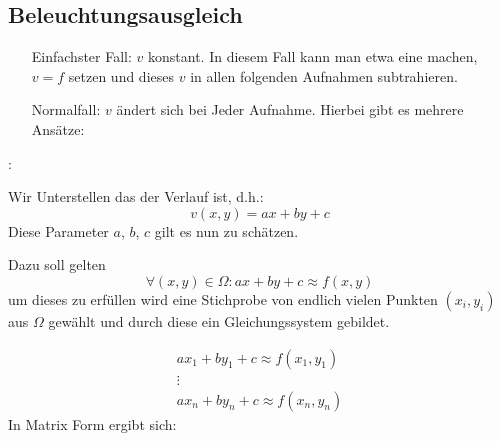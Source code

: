 \subsection{Beleuchtungsausgleich}

\begin{enumerate}
  \item[Einfachster Fall:] $v$ konstant. In diesem Fall kann man etwa eine  machen, $v=f$ setzen und dieses $v$ in allen folgenden Aufnahmen subtrahieren.
  \item[Normalfall:] $v$ ändert sich bei Jeder Aufnahme. Hierbei gibt es mehrere Ansätze:
\end{enumerate}

\begin{enumerate}[label = \alph*)]
  \item {}: \\
  \begin{minipage}[c]{0.6\linewidth}
          \item[] Wir Unterstellen das der Verlauf  ist, d.h.:
          \[v(x,y) = a x + b y + c\]
          Diese Parameter $a$, $b$, $c$ gilt es nun zu schätzen.
    \end{minipage}
    \hfill
    \begin{minipage}[c]{0.35\linewidth}
              \begin{center}
      \end{center}
    \end{minipage}
    Dazu soll gelten
    \[\forall (x,y) \in \Omega : ax+by+c \approx f(x,y)\]
    um dieses zu erfüllen wird eine Stichprobe von endlich vielen Punkten $(x_i,y_i)$ aus $\Omega$ gewählt und durch diese ein Gleichungssystem gebildet.

    \begin{gather*}
    ax_1+by_1+c \approx f(x_1,y_1)\\
    \vdots \\
    ax_n+by_n+c \approx f(x_n,y_n)
    \end{gather*}
    In Matrix Form ergibt sich:


\end{enumerate}
